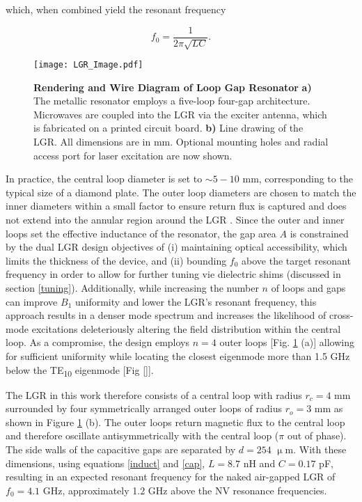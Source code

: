 which, when combined yield the resonant frequency

\begin{equation}
f_0 = \frac{1}{2 \pi \sqrt{LC}}.
\end{equation}

\begin{figure}[t!]
\centering
\texttt{[image: LGR\_Image.pdf]}  
\caption{\textbf{Rendering and Wire Diagram of Loop Gap Resonator} \textbf{a)} The metallic resonator employs a five-loop four-gap architecture. Microwaves are coupled into the LGR via the exciter antenna, which is fabricated on a printed circuit board. \textbf{b)} Line drawing of the LGR. All dimensions are in mm. Optional mounting holes and radial access port for laser excitation are now shown.}
\label{LGR_drawing}
\end{figure}

In practice, the central loop diameter is set to $\sim 5-10 $ mm, corresponding to the typical size of a diamond plate. The outer loop diameters are chosen to match the inner diameters within a small factor to ensure return flux is captured and does not extend into the annular region around the LGR \cite{}. Since the outer and inner loops set the effective inductance of the resonator, the gap area $A$ is constrained by the dual LGR design objectives of (i) maintaining optical accessibility, which limits the thickness of the device, and (ii) bounding $f_0$ above the target resonant frequency in order to allow for further tuning vie dielectric shims (discussed in section \ref{tuning}). Additionally, while increasing the number $n$ of loops and gaps can improve $B_1$ uniformity \cite{piasecki1993field} and lower the LGR's resonant frequency, this approach results in a denser mode spectrum \cite{froncisz1982loop} and increases the likelihood of cross-mode excitations deleteriously altering the field distribution within the central loop. As a compromise, the design employs $n=4$ outer loops [Fig. \ref{LGR_drawing} (a)] allowing for sufficient uniformity while locating the closest eigenmode more than 1.5 GHz below the TE\textsubscript{10} eigenmode [Fig \ref{}].  

The LGR in this work therefore consists of a central loop with radius $r_c = 4$ mm surrounded by four symmetrically arranged outer loops of radius $r_o = 3$ mm as shown in Figure \ref{LGR_drawing} (b). The outer loops return magnetic flux to the central loop and therefore oscillate antisymmetrically with the central loop ($\pi$ out of phase). The side walls of the capacitive gaps are separated by $d = 254$ $\upmu$m. With these dimensions, using equations \ref{induct} and \ref{cap}, $L = 8.7$ nH and $C = 0.17$ pF, resulting in an expected resonant frequency for the naked air-gapped LGR of $f_0 = 4.1$ GHz, approximately 1.2 GHz above the NV resonance frequencies.

